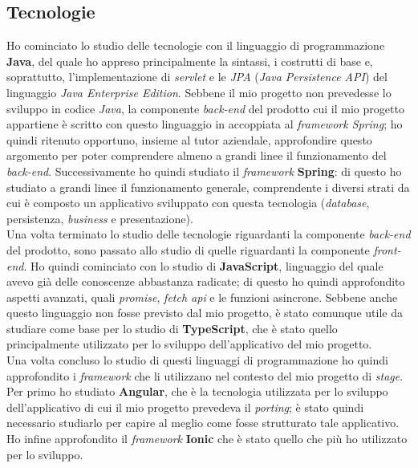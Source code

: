 
\subsection{Tecnologie}
Ho cominciato lo studio delle tecnologie con il linguaggio di programmazione \textbf{Java}, del quale ho appreso principalmente la sintassi, i costrutti di base e, soprattutto, l'implementazione di \textit{servlet} e le \textit{JPA} (\textit{Java Persistence API}) del linguaggio \textit{Java Enterprise Edition}. Sebbene il mio progetto non prevedesse lo sviluppo in codice \textit{Java}, la componente \textit{back-end} del prodotto cui il mio progetto appartiene è scritto con questo linguaggio in accoppiata al \textit{framework Spring}; ho quindi ritenuto opportuno, insieme al tutor aziendale, approfondire questo argomento per poter comprendere almeno a grandi linee il funzionamento del \textit{back-end}. Successivamente ho quindi studiato il \textit{framework} \textbf{Spring}: di questo ho studiato a grandi linee il funzionamento generale, comprendente i diversi strati da cui è composto un applicativo sviluppato con questa tecnologia (\textit{database}, persistenza, \textit{business} e presentazione). \\
Una volta terminato lo studio delle tecnologie riguardanti la componente \textit{back-end} del prodotto, sono passato allo studio di quelle riguardanti la componente \textit{front-end}. Ho quindi cominciato con lo studio di \textbf{JavaScript}, linguaggio del quale avevo già delle conoscenze abbastanza radicate; di questo ho quindi approfondito aspetti avanzati, quali \textit{promise}, \textit{fetch api} e le funzioni asincrone. Sebbene anche questo linguaggio non fosse previsto dal mio progetto, è stato comunque utile da studiare come base per lo studio di \textbf{TypeScript}, che è stato quello principalmente utilizzato per lo sviluppo dell'applicativo del mio progetto. \\
Una volta concluso lo studio di questi linguaggi di programmazione ho quindi approfondito i \textit{framework} che li utilizzano nel contesto del mio progetto di \textit{stage}. Per primo ho studiato \textbf{Angular}, che è la tecnologia utilizzata per lo sviluppo dell'applicativo di cui il mio progetto prevedeva il \textit{porting}; è stato quindi necessario studiarlo per capire al meglio come fosse strutturato tale applicativo. Ho infine approfondito il \textit{framework} \textbf{Ionic} che è stato quello che più ho utilizzato per lo sviluppo. \\


